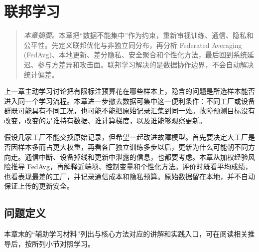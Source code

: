 ﻿\chapter{联邦学习}
\begin{quote}\small
\textit{本章摘要。}本章把“数据不能集中”作为约束，重新审视训练、通信、隐私和公平性。先定义联邦优化与非独立同分布，再分析 Federated Averaging (FedAvg)、本地更新、差分隐私、安全聚合和个性化方法，最后回到系统延迟、参与方差异和攻击面。联邦学习解决的是数据协作边界，不会自动解决统计偏差。
\end{quote}
上一章主动学习讨论把有限标注预算花在哪些样本上，隐含的问题是所选样本能否进入同一个学习流程。本章进一步撤去数据可集中这一便利条件：不同工厂或设备群既可能具有不同工况，也可能不能把原始记录汇集到同一处。故障预测目标没有改变，改变的是谁持有数据、谁计算梯度，以及谁能够观察更新。

假设几家工厂不能交换原始记录，但希望一起改进故障模型。首先要决定大工厂是否因样本多而占更大权重，再看各厂独立训练多步以后，更新为什么可能朝不同方向走。通信中断、设备掉线和更新中泄露的信息，也都要考虑。本章从加权经验风险推导 FedAvg，再解释近端项、控制变量和个性化方法。评价时既看平均成绩，也看表现最差的工厂，并记录通信成本和隐私预算。原始数据留在本地，并不自动保证上传的更新安全。
\section{问题定义}

本章末的“辅助学习材料”列出与核心方法对应的讲解和实践入口，可在阅读相关推导后，按所列小节对照学习。

